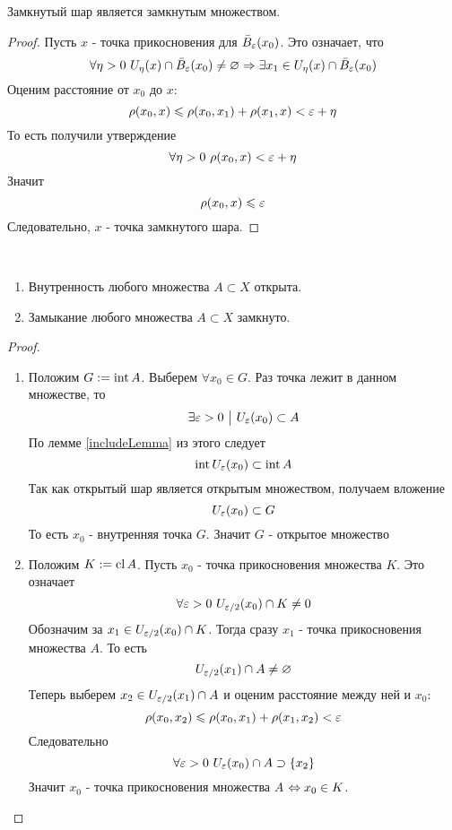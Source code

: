 \begin{lemma}
	Замкнутый шар является замкнутым множеством.
\end{lemma}

\begin{proof}
	Пусть $x$ - точка прикосновения для $\bar{B}_\varepsilon(x_0)$. Это означает, что
	\[
		\forall \eta > 0\ U_\eta(x) \cap \bar{B}_\varepsilon(x_0) \neq \varnothing \Rightarrow \exists x_1 \in U_\eta(x) \cap \bar{B}_\varepsilon(x_0)
	\]
	Оценим расстояние от $x_0$ до $x$:
	\[
		\rho(x_0, x) \leqslant \rho(x_0, x_1) + \rho(x_1, x) < \varepsilon + \eta
	\]
	То есть получили утверждение
	\[
		\forall \eta > 0\ \rho(x_0, x) < \varepsilon + \eta
	\]
	Значит
	\[
		\rho(x_0, x) \leqslant \varepsilon
	\]
	Следовательно, $x$ - точка замкнутого шара.
\end{proof}

\begin{theorem}~
	\begin{enumerate}
		\item Внутренность любого множества $A \subset X$ открыта.
		
		\item Замыкание любого множества $A \subset X$ замкнуто.
	\end{enumerate}
\end{theorem}

\begin{proof}~
	\begin{enumerate}
		\item Положим $G := \operatorname{int} A$. Выберем $\forall x_0 \in G$. Раз точка лежит в данном множестве, то
		\[
			\exists \varepsilon > 0 \ \big|\  U_\varepsilon(x_0) \subset A
		\]
		По лемме \ref{includeLemma} из этого следует
		\[
			\operatorname{int} U_\varepsilon(x_0) \subset \operatorname{int} A
		\]
		Так как открытый шар является открытым множеством, получаем вложение
		\[
			U_\varepsilon(x_0) \subset G
		\]
		То есть $x_0$ - внутренняя точка $G$. Значит $G$ - открытое множество
	
		\item Положим $K := \operatorname{cl} A$. Пусть $x_0$ - точка прикосновения множества $K$. Это означает
		\[
			\forall \varepsilon > 0\ U_{\varepsilon / 2}(x_0) \cap K \neq 0
		\]
		Обозначим за $x_1 \in U_{\varepsilon / 2}(x_0) \cap K$. Тогда сразу $x_1$ - точка прикосновения множества $A$. То есть
		\[
			U_{\varepsilon / 2}(x_1) \cap A \neq \varnothing
		\]
		Теперь выберем $x_2 \in U_{\varepsilon / 2}(x_1) \cap A$ и оценим расстояние между ней и $x_0$:
		\[
			\rho(x_0, x_2) \leqslant \rho(x_0, x_1) + \rho(x_1, x_2) < \varepsilon
		\]
		Следовательно
		\[
			\forall \varepsilon > 0\ U_{\varepsilon}(x_0) \cap A \supset \{x_2\}
		\]
		Значит $x_0$ - точка прикосновения множества $A$ $\Leftrightarrow x_0 \in K$.
	\end{enumerate}
\end{proof}

